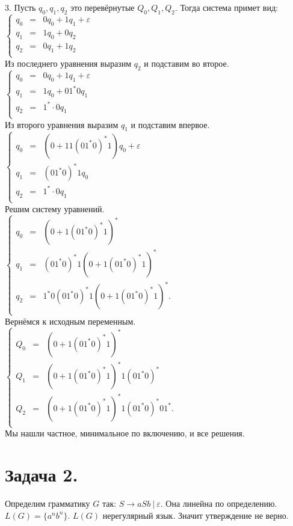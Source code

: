 \documentclass[12pt]{article}
\theoremstyle{definition}
\theoremstyle{definition}
\let\ra\rightarrow
\let\eps\varepsilon
\begin{document}
3. Пусть $q_0, q_1, q_2$ это перевёрнутые $Q_0, Q_1, Q_2.$ Тогда система примет вид:\\
	$
	\left\{
	\begin{array}{rcl}
	q_0&=& 0 q_0 + 1 q_1 +\varepsilon \\
	q_1&=& 1 q_0 + 0 q_2\\
	q_2&=& 0 q_1 + 1 q_2\\
	\end{array}
	\right.
	$\\
	Из последнего уравнения выразим $q_2$ и подставим во второе. \\
	$
	\left\{
	\begin{array}{rcl}
	q_0&=& 0 q_0 + 1 q_1 +\varepsilon \\
	q_1&=& 1 q_0 + 0 1^*0 q_1\\
	q_2&=& 1^* \cdot 0 q_1\\
	\end{array}
	\right.
	$\\
	Из второго уравнения выразим $q_1$ и подставим впервое. \\
	$
	\left\{
	\begin{array}{rcl}
	q_0&=& (0 + 1 1 (01^*0)^*1)q_0 +\varepsilon \\
	q_1&=& (01^*0)^*1q_0\\
	q_2&=& 1^* \cdot 0 q_1\\
	\end{array}
	\right.
	$\\
	Решим систему уравнений.\\
	$
	\left\{
	\begin{array}{rcl}
	q_0&=& (0 + 1 (01^*0)^*1)^* \\
	q_1&=& (01^*0)^*1(0 + 1 (01^*0)^*1)^*\\
	q_2&=& 1^*0(01^*0)^*1(0 + 1 (01^*0)^*1)^*.\\
	\end{array}
	\right.
	$\\
	Вернёмся к исходным переменным.\\
	$
	\left\{
	\begin{array}{rcl}
	Q_0&=& (0 + 1 (01^*0)^*1)^* \\
	Q_1&=& (0 + 1 (01^*0)^*1)^*1(01^*0)^*\\
	Q_2&=& (0 + 1 (01^*0)^*1)^*1(01^*0)^*01^*.\\
	\end{array}
	\right.
	$\\
	Мы нашли частное, минимальное по включению, и все решения.


\section*{Задача  2.}
Определим грамматику $G$ так: $S \ra aSb\ |\ \eps$. Она линейна по определению. $L(G) = \{a^nb^n\}$. $L(G)$ нерегулярный язык. Значит утверждение не верно.
\end{document}
